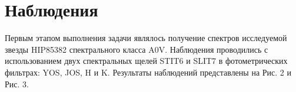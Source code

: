 \documentclass[a4paper]{article}
\begin{document}
\section{Наблюдения}
Первым этапом выполнения задачи являлось получение спектров исследуемой звезды HIP85382 спектрального класса A0V. Наблюдения проводились с использованием двух спектральных  щелей STIT6 и SLIT7 в фотометрических фильтрах: YOS, JOS, H и K. Результаты наблюдений представлены на Рис. 2 и Рис. 3.
\begin{figure}[h]
\begin{minipage}[h]{0.5\linewidth}
\end{minipage}
\begin{minipage}[h]{0.5\linewidth}
\end{minipage}
\begin{minipage}[h]{0.50\linewidth}

\end{minipage}
\end{figure}
\end{document}
